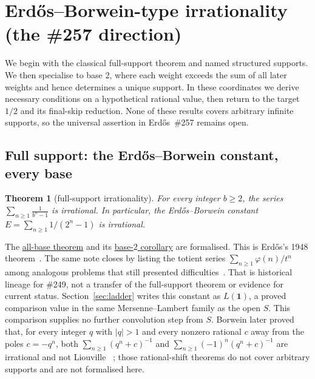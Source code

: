 \documentclass[11pt]{article}
\newcommand{\commit}{bb4e24651b37cd096d3749ef299c3317930b3a3b}
\newcommand{\repobase}{https://github.com/wcook04/plectis-lean-erdos249-257/blob/\commit}
\newcommand{\PK}{Erdos249257}
\newcommand{\lword}[4]{\href{\repobase/\PK/#1\#L#2}{#4}}
\newtheorem{theorem}{Theorem}[section]
\theoremstyle{definition}
\theoremstyle{remark}
\newcommand{\ph}{\varphi}
\begin{document}
\section{Erd\H{o}s--Borwein-type irrationality (the \#257 direction)}\label{sec:eb}

We begin with the classical full-support theorem and named structured
supports.  We then specialise to base \(2\), where each weight exceeds the sum
of all later weights and hence determines a unique support.  In these
coordinates we derive necessary conditions on a hypothetical rational value,
then return to the target \(1/2\) and its final-skip reduction.  None of these
results covers arbitrary infinite supports, so the universal assertion in
Erd\H{o}s~\#257 remains open.

\subsection{Full support: the Erd\H{o}s--Borwein constant, every base}

\begin{theorem}[full-support irrationality]\label{res:full}
For every integer $b\ge2$, the series $\displaystyle\sum_{n\ge1}\frac{1}{b^n-1}$ is
irrational. In particular, the Erd\H{o}s--Borwein constant $E=\sum_{n\ge1}1/(2^n-1)$
is irrational.
\end{theorem}
\noindent The
\lword{CertificateKernel.lean}{8328}{irrational_erdosSum_full_support}{all-base theorem}
and its
\lword{CertificateKernel.lean}{8335}{irrational_erdosBorwein_series}{base-\(2\) corollary}
are formalised.  This is Erd\H{o}s's 1948 theorem~\cite[Theorem, p.~63]{erdos1948}.
The same note closes by listing the totient series
\(\sum_{n\ge1}\ph(n)/t^n\) among analogous problems that still presented
difficulties~\cite[p.~66]{erdos1948}.  That is historical lineage for
\#249, not a transfer of the full-support theorem or evidence for current status.
Section~\ref{sec:ladder} writes this constant as $L(\mathbf 1)$, a proved
comparison value in the same Mersenne--Lambert family as the open $S$.  This
comparison supplies no further convolution step from $S$.  Borwein later proved that,
for every integer $q$ with $|q|>1$ and every nonzero rational $c$ away from
the poles $c=-q^n$, both
\(\sum_{n\ge1}(q^n+c)^{-1}\) and
\(\sum_{n\ge1}(-1)^n(q^n+c)^{-1}\) are irrational and not Liouville
~\cite[Thms.~1--2, pp.~142, 145--146]{borwein1992}; those rational-shift
theorems do not cover arbitrary supports and are not formalised here.
\end{document}
